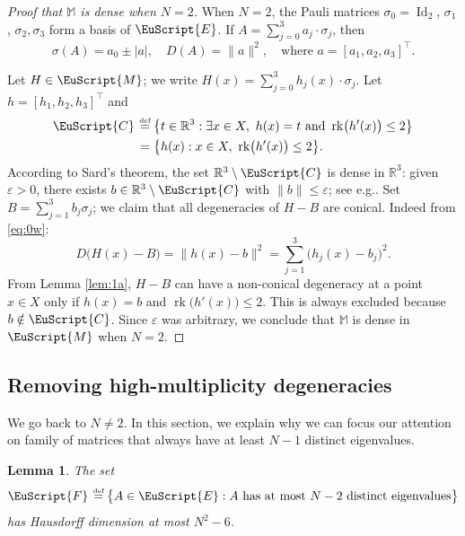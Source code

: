 \documentclass[10pt]{amsart}
\let\pazocal\EuScript
\let\sep:
\newtheorem{lem}{Lemma}[section]
\theoremstyle{definition}
\DeclareMathOperator{\Id}{Id}
\DeclareMathOperator{\rk}{rk}
\newcommand{\FF}{\pazocal{F}}
\newcommand{\CC}{\pazocal{C}}
\newcommand{\EE}{\pazocal{E}}
\newcommand{\MM}{\pazocal{M}}
\newcommand{\R}{\mathbb{R}}
\newcommand{\Mm}{\mathbb{M}}
\let\epsi\varepsilon
\newcommand{\de}{\,\mathrel{\stackrel{\makebox[0pt]{\mbox{\normalfont\tiny def}}}{=}}}
\providecommand{\eg}{e.g.}\providecommand{\ie}{i.e.}\providecommand{\etc}{etc.}\providecommand{\resp}{resp.}\providecommand{\cf}{cf.}
\begin{document}
\begin{proof}[Proof that $\Mm$ is dense when $N=2$] When $N=2$, the Pauli matrices $\sigma_0 = \Id_2$, $\sigma_1$, $\sigma_2, \sigma_3$ form a basis of $\EE$. If $A = \sum_{j=0}^3 a_j \cdot \sigma_j$, then
\begin{equation}\label{eq:0w}
\sigma(A) = a_0 \pm |a|, \quad D(A) = \| a \|^2, \quad \text{where } a = [a_1,a_2,a_3]^\top.
\end{equation}

Let $H \in \MM$; we write $H(x) = \sum_{j=0}^3 h_j(x) \cdot \sigma_j$.
Let $h = [h_1,h_2,h_3]^\top$ and
\begin{align*}
\CC &\de \bigl\{ t \in \R^3\sep \exists x \in X, \ h(x) = t \text{ and } \rk \bigl(h'(x)\bigr) \leq 2 \bigr\} \\
&\,=
\bigl\{ h(x)\sep x \in X, \ \rk \bigl(h'(x)\bigr) \leq 2 \bigr\}.
\end{align*}
According to Sard's theorem, the set $\R^3 \setminus \CC$ is dense in $\R^3$: given $\epsi > 0$, there exists $b \in \R^3 \setminus \CC$ with $\| b \| \leq \epsi$; see \eg \cite[\S1.7]{GP74}. Set $B = \sum_{j=1}^3 b_j \sigma_j$; we claim that all degeneracies of $H-B$ are conical. Indeed from \eqref{eq:0w}:
\begin{equation*}
D\bigl(H(x) - B\bigr) = \big\| h(x) - b \big\|^2 = \sum_{j=1}^3 \bigl( h_j(x) -b_j \bigr)^2.
\end{equation*}
From Lemma \ref{lem:1a}, $H-B$ can have a non-conical degeneracy at a point $x \in X$ only if $h(x) = b$ and $\rk \bigl(h'(x)\bigr) \leq 2$. This is always excluded because $b \notin \CC$. Since $\epsi$ was arbitrary, we conclude that $\Mm$ is dense in $\MM$ when $N=2$. \end{proof}

\subsection{Removing high-multiplicity degeneracies}\label{sec:3.2} We go back to $N \neq 2$. In this section, we explain why we can focus our attention on family of matrices that always have at least $N-1$ distinct eigenvalues.

\begin{lem}\label{lem:1d} The set
\begin{equation*}
\FF \de \bigl\{ A \in \EE \sep A \text{ has at most $N-2$ distinct eigenvalues} \bigr\}
\end{equation*}
has Hausdorff dimension at most $N^2-6$.
\end{lem}
\end{document}
